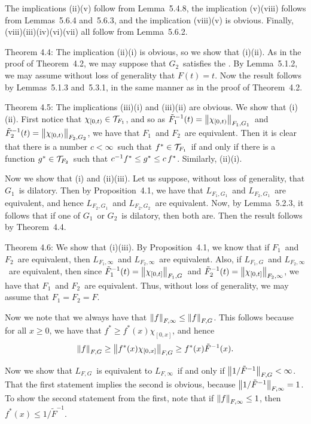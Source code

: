 The implications (ii)\iff(v) follow from Lemma~5.4.8,
the implication (v)\implies(viii) follows from Lemmas~5.6.4 and~5.6.3, and the
implication (viii)\implies(v) is obvious.
Finally, (viii)\iff(iii)\iff(iv)\iff(vi)\iff(vii) all follow from Lemma~5.6.2.
\endproof

\Proofof Theorem 4.4:
The implication (ii)\implies(i) is obvious, so we show that (i)\implies(ii). As
in the proof of Theorem~4.2, we may suppose that $G_2$\ satisfies the
\Deltacond. By Lemma~5.1.2, we may assume without loss of generality that $F(t) =
t$. Now the result follows by Lemmas~5.1.3 and~5.3.1, in the same manner as in
the proof of Theorem~4.2.
\endproof

\Proofof Theorem 4.5:
The implications (iii)\implies(i) and (iii)\implies(ii) are obvious. We
show that (i)\implies(ii). First notice that $\chi_{[0,t)} \in \T_{F_1}$, and
so as $\tilde F_1^{-1}(t) = \left\| \chi_{[0,t)} \right\|_{F_1,G_1}$\ and  $\tilde
F_2^{-1}(t) = \left\| \chi_{[0,t)} \right\|_{F_2,G_2}$, we have that $F_1$\ and $F_2$\
are equivalent. Then it is clear that there is a number $c<\infty$\ such that
$f^*\in\T_{F_1}$\ if and only if there is a function $g^*\in\T_{F_2}$\ such that
${c^{-1}} f^* \le g^* \le c\,f^*$. Similarly, (ii)\implies(i).

Now we show that (i) and (ii)\implies(iii). Let us suppose, without loss of
generality, that $G_1$\ is dilatory. Then by
Proposition~4.1, we have that $L_{F_1,G_1}$\ and $L_{F_2,G_1}$\ are equivalent,
and hence $L_{F_2,G_1}$\ and $L_{F_2,G_2}$\ are equivalent. Now, by Lemma~5.2.3,
it follows that if one of $G_1$\ or $G_2$\ is dilatory, then both are. Then the
result follows by Theorem~4.4. 
\endproof

\Proofof Theorem 4.6: We show that (i)\iff(iii). By Proposition~4.1, we know
that if $F_1$\ and $F_2$\
are equivalent, then $L_{F_1,\infty}$\ and $L_{F_2,\infty}$\ are
equivalent. Also, if $L_{F_1,G}$\ and $L_{F_2,\infty}$\ are
equivalent, then since $\tilde F_1^{-1}(t) =
\left\| \chi_{[0,t]} \right\|_{F_1,G}$\ and  $\tilde F_2^{-1}(t) =
\left\| \chi_{[0,t]} \right\|_{F_2,\infty}$, we have that $F_1$\ and $F_2$\
are equivalent. Thus,
without loss of generality, we may assume that $F_1 = F_2 = F$.

Now we note that we always have that $\left\| f \right\|_{F,\infty} \le \left\| f \right\|_{F,G}$. This follows because for all $x\ge0$, we have that $f^* \ge f^*(x)
\chi_{[0,x]}$, and hence 
$$ \left\| f \right\|_{F,G} \ge \left\| f^*(x)\chi_{[0,x]} \right\|_{F,G} \ge 
   f^*(x) \tilde F^{-1}(x) .$$

Now we show that $L_{F,G}$\ is equivalent to $L_{F,\infty}$\ if and only if
$\left\| 1/\tilde F^{-1} \right\|_{F,G} < \infty$. That the first statement implies the
second is obvious, because $\left\| 1/\tilde F^{-1} \right\|_{F,\infty} = 1$. To show the
second statement from the first, note that if $\left\| f \right\|_{F,\infty} \le 1$, then
$f^*(x) \le 1/\tilde F^{-1}$.

